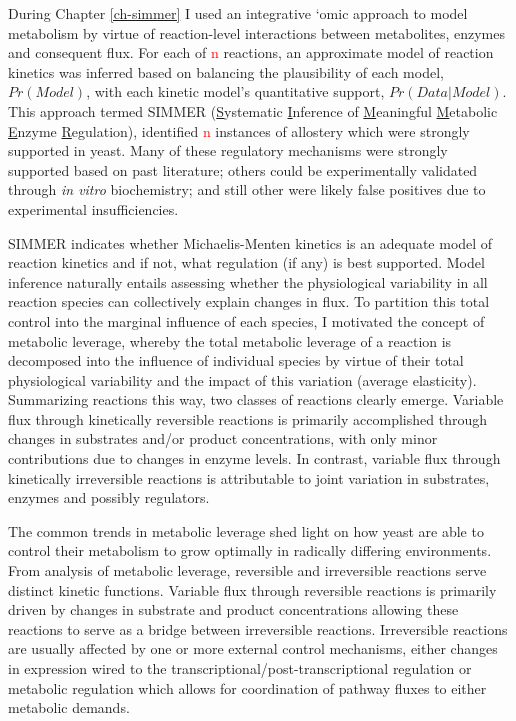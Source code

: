 During Chapter \ref{ch-simmer} I used an integrative `omic approach to model metabolism by virtue of reaction-level interactions between metabolites, enzymes and consequent flux. For each of \textcolor{red}{n} reactions, an approximate model of reaction kinetics was inferred based on balancing the plausibility of each model, $Pr(Model)$, with each kinetic model's quantitative support, $Pr(Data | Model)$. This approach termed SIMMER (\underline{S}ystematic \underline{I}nference of \underline{M}eaningful \underline{M}etabolic \underline{E}nzyme \underline{R}egulation), identified \textcolor{red}{n} instances of allostery which were strongly supported in yeast.  Many of these regulatory mechanisms were strongly supported based on past literature; others could be experimentally validated through \textit{in vitro} biochemistry; and still other were likely false positives due to experimental insufficiencies.

SIMMER indicates whether Michaelis-Menten kinetics is an adequate model of reaction kinetics and if not, what regulation (if any) is best supported. Model inference naturally entails assessing whether the physiological variability in all reaction species can collectively explain changes in flux. To partition this total control into the marginal influence of each species, I motivated the concept of metabolic leverage, whereby the total metabolic leverage of a reaction is decomposed into the influence of individual species by virtue of their total physiological variability and the impact of this variation (average elasticity). Summarizing reactions this way, two classes of reactions clearly emerge.  Variable flux through kinetically reversible reactions is primarily accomplished through changes in substrates and/or product concentrations, with only minor contributions due to changes in enzyme levels.  In contrast, variable flux through kinetically irreversible reactions is attributable to joint variation in substrates, enzymes and possibly regulators.

The common trends in metabolic leverage shed light on how yeast are able to control their metabolism to grow optimally in radically differing environments. From analysis of metabolic leverage, reversible and irreversible reactions serve distinct kinetic functions. Variable flux through reversible reactions is primarily driven by changes in substrate and product concentrations allowing these reactions to serve as a bridge between irreversible reactions. Irreversible reactions are usually affected by one or more external control mechanisms, either changes in expression wired to the transcriptional/post-transcriptional regulation or metabolic regulation which allows for coordination of pathway fluxes to either metabolic demands.

